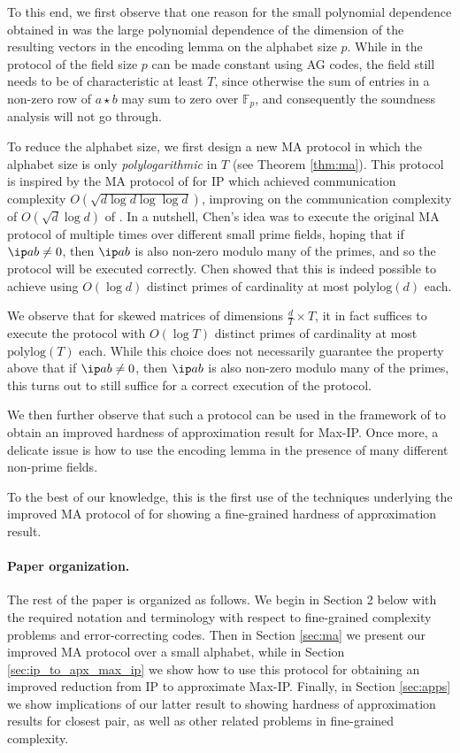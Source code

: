 \documentclass[11pt]{article}
\theoremstyle{plain}
\theoremstyle{remark}
\newcommand{\F}{\mathbb{F}}
\newcommand{\polylog}{\mathrm{polylog}}
\begin{document}
To this end, we first observe that one reason for the small polynomial dependence obtained in \cite{CW19} was the large polynomial dependence of the dimension of the resulting vectors in the encoding lemma on the alphabet size $p$. While in the protocol of \cite{Rub18} the field size $p$ can be made constant using AG codes, the field still needs to be of characteristic at least $T$, since otherwise the sum of entries in a non-zero row of $a \star b$ may sum to zero over $\F_p$, and consequently the soundness analysis will not go through.

To reduce the alphabet size, we first design a new MA protocol in which the alphabet size is only \emph{polylogarithmic} in $T$ (see Theorem \ref{thm:ma}).
This protocol is inspired by the MA protocol of \cite{Che18} for IP which achieved communication complexity $O(\sqrt{d \log d\log \log d})$, improving on the communication complexity of $O(\sqrt{d} \log d)$ of \cite{AW09}.
In a nutshell, Chen's idea was to execute the original MA protocol of  \cite{AW09} multiple times over different small prime fields, hoping that if $\ip a b \neq 0$, then $\ip a b$ is also non-zero modulo many of the primes, and so the protocol will be executed correctly.
Chen showed that this is indeed possible to achieve using $O(\log d)$ distinct primes of cardinality at most $\polylog(d)$ each.

We observe that for skewed matrices of  dimensions $\frac d T \times T$, it in fact suffices to execute the protocol with $O(\log T)$ distinct primes of cardinality at most $\polylog(T)$ each. While this choice does not necessarily guarantee the property above that if $\ip a b \neq 0$, then $\ip a b$ is also non-zero modulo many of the primes, this turns out to still suffice for a correct execution of the protocol. 

We then further observe that such a protocol can be used in the framework of \cite{CW19} to obtain an improved hardness of approximation result for Max-IP. Once more, a delicate issue is how to use the encoding lemma in the presence of many different non-prime fields.   

To the best of our knowledge, this is the first use of the techniques underlying the improved MA protocol of \cite{Che18} for showing a fine-grained hardness of approximation result.

\paragraph{Paper organization.} The rest of the paper is organized as follows. We begin in Section 2 below with the required notation and terminology with respect to fine-grained complexity problems and error-correcting codes. Then in Section \ref{sec:ma} we present our improved MA protocol over a small alphabet, while in Section
\ref{sec:ip_to_apx_max_ip} we show how to use this protocol for obtaining an improved reduction from IP to approximate Max-IP. Finally, in Section \ref{sec:apps} we show implications of our latter result to showing hardness of approximation results for closest pair, as well as other related problems in fine-grained complexity.
\end{document}

